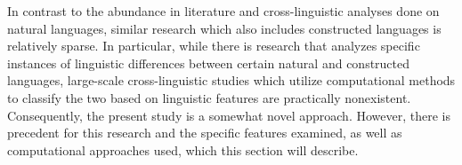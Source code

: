 \documentclass[12pt,a4paper]{article}
\numberwithin{figure}{section}
\numberwithin{table}{section}
\numberwithin{definition}{section}
\begin{document}


In contrast to the abundance in literature and cross-linguistic analyses done on natural languages, similar research which also includes constructed languages is relatively sparse. In particular, while there is research that analyzes specific instances of linguistic differences between certain natural and constructed languages, large-scale cross-linguistic studies which utilize computational methods to classify the two based on linguistic features are practically nonexistent. Consequently, the present study is a somewhat novel approach. However, there is precedent for this research and the specific features examined, as well as computational approaches used, which this section will describe.
\end{document}
